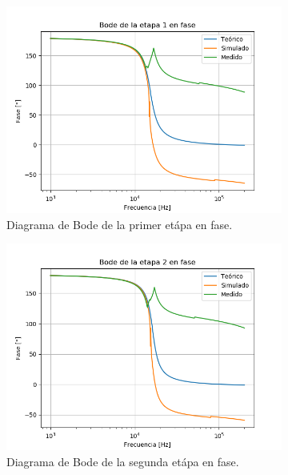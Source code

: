 \begin{figure}[H]
\centering
\begin{subfigure}{.49\textwidth}
\centering
	\includegraphics[width=\textwidth]{Imagenes/Pha-1.png}
	\caption{Diagrama de Bode de la primer etápa en fase.}
	\label{fig:pha1}
\end{subfigure}
\centering
\begin{subfigure}{.49\textwidth}
\centering
	\includegraphics[width=\textwidth]{Imagenes/Pha-2.png}
	\caption{Diagrama de Bode de la segunda etápa en fase.}
	\label{fig:pha2}
\end{subfigure}
\centering
\begin{subfigure}{.49\textwidth}
\centering

\end{subfigure}
\end{figure}
